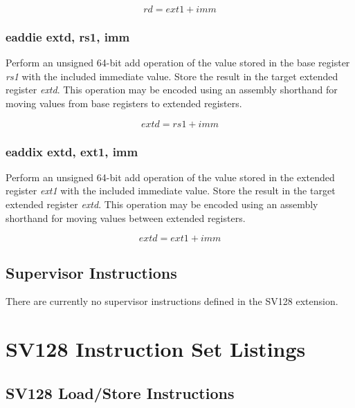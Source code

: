 \documentclass{article}
\begin{document}
\begin{equation}
rd = ext1 + imm
\end{equation}

\subsubsection{eaddie extd, rs1, imm}

Perform an unsigned 64-bit add operation of the value stored in the base 
register \textit{rs1} with the included immediate value.  Store the result in the 
target extended register \textit{extd}.  This operation may be encoded 
using an assembly shorthand for moving values from base registers 
to extended registers.

\begin{equation}
extd = rs1 + imm
\end{equation}

\subsubsection{eaddix extd, ext1, imm}

Perform an unsigned 64-bit add operation of the value stored in the extended
register \textit{ext1} with the included immediate value.  Store the result in the 
target extended register \textit{extd}.  This operation may be encoded using 
an assembly shorthand for moving values between extended registers.  

\begin{equation}
extd = ext1 + imm
\end{equation}

\subsection{Supervisor Instructions}

There are currently no supervisor instructions defined in the SV128 extension.

\clearpage
\section{SV128 Instruction Set Listings}
\label{sec:SV128InstructionSetListings}

\subsection{SV128 Load/Store Instructions}
\end{document}
